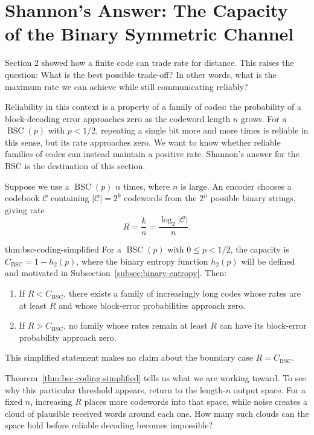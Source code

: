 \section{Shannon's Answer: The Capacity of the Binary Symmetric Channel}

Section 2 showed how a finite code can trade rate for distance. This raises the question: What is the best possible trade-off? In other words, what is the maximum rate we can achieve while still communicating reliably?

Reliability in this context is a property of a family of codes: the probability of a block-decoding error approaches zero as the codeword length $n$ grows. For a $\operatorname{BSC}(p)$ with $p<1/2$, repeating a single bit more and more times is reliable in this sense, but its rate approaches zero. We want to know whether reliable families of codes can instead maintain a positive rate. Shannon's answer for the BSC is the destination of this section.

Suppose we use a $\operatorname{BSC}(p)$ $n$ times, where $n$ is large. An encoder chooses a codebook $\mathcal{C}$ containing $|\mathcal{C}|=2^k$ codewords from the $2^n$ possible binary strings, giving rate
\begin{equation}
R=\frac{k}{n}=\frac{\log_2|\mathcal{C}|}{n}.
\label{eq:chapter-three-rate}
\end{equation}

\begin{smjtheorem}{thm:bsc-coding-simplified}
For a $\operatorname{BSC}(p)$ with $0\leq p<1/2$, the capacity is $C_{\mathrm{BSC}}=1-h_2(p)$, where the binary entropy function $h_2(p)$ will be defined and motivated in Subsection~\ref{subsec:binary-entropy}. Then:
\begin{enumerate}
    \item If $R<C_{\mathrm{BSC}}$, there exists a family of increasingly long codes whose rates are at least $R$ and whose block-error probabilities approach zero.
    \item If $R>C_{\mathrm{BSC}}$, no family whose rates remain at least $R$ can have its block-error probability approach zero.
\end{enumerate}
This simplified statement makes no claim about the boundary case $R=C_{\mathrm{BSC}}$.
\end{smjtheorem}

Theorem~\ref{thm:bsc-coding-simplified} tells us what we are working toward. To see why this particular threshold appears, return to the length-$n$ output space. For a fixed $n$, increasing $R$ places more codewords into that space, while noise creates a cloud of plausible received words around each one. How many such clouds can the space hold before reliable decoding becomes impossible?

